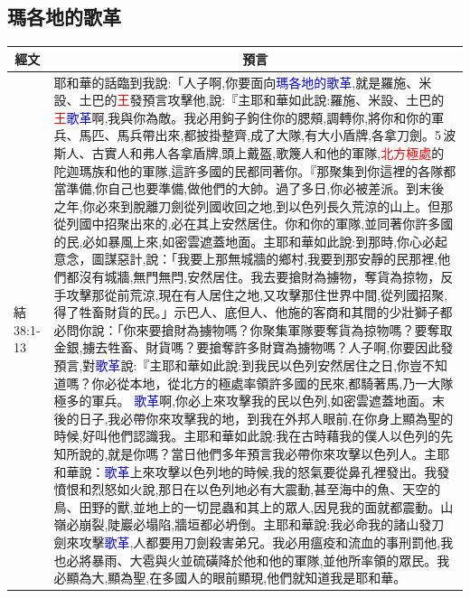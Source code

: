 \subsection{瑪各地的歌革}
\begin{table}[H]
\centering
\begin{tabular}{p{}|p{16.5cm}}\hline\hline
  \multicolumn{1}{c|}{經文}&\multicolumn{1}{c}{預言}\\\hline


結38:1-13&耶和華的話臨到我說:「人子啊,你要面向\textcolor{blue}{瑪各地的歌革},就是羅施、米設、土巴的\textcolor{red}{王}發預言攻擊他,說:『主耶和華如此說:羅施、米設、土巴的\textcolor{red}{王}\textcolor{blue}{歌革}啊,我與你為敵。我必用鉤子鉤住你的腮頰,調轉你,將你和你的軍兵、馬匹、馬兵帶出來,都披掛整齊,成了大隊,有大小盾牌,各拿刀劍。5 波斯人、古實人和弗人各拿盾牌,頭上戴盔,歌篾人和他的軍隊,\textcolor{red}{北方極處}的陀迦瑪族和他的軍隊,這許多國的民都同著你。『那聚集到你這裡的各隊都當準備,你自己也要準備,做他們的大帥。過了多日,你必被差派。到末後之年,你必來到脫離刀劍從列國收回之地,到以色列長久荒涼的山上。但那從列國中招聚出來的,必在其上安然居住。你和你的軍隊,並同著你許多國的民,必如暴風上來,如密雲遮蓋地面。主耶和華如此說:到那時,你心必起意念，圖謀惡計,說：「我要上那無城牆的鄉村,我要到那安靜的民那裡,他們都沒有城牆,無門無閂,安然居住。我去要搶財為擄物，奪貨為掠物，反手攻擊那從前荒涼,現在有人居住之地,又攻擊那住世界中間,從列國招聚,得了牲畜財貨的民。」示巴人、底但人、他施的客商和其間的少壯獅子都必問你說：「你來要搶財為擄物嗎？你聚集軍隊要奪貨為掠物嗎？要奪取金銀,擄去牲畜、財貨嗎？要搶奪許多財寶為擄物嗎？人子啊,你要因此發預言,對\textcolor{blue}{歌革}說:『主耶和華如此說:到我民以色列安然居住之日,你豈不知道嗎？你必從本地，從北方的極處率領許多國的民來,都騎著馬,乃一大隊極多的軍兵。 \textcolor{blue}{歌革}啊,你必上來攻擊我的民以色列,如密雲遮蓋地面。末後的日子,我必帶你來攻擊我的地，到我在外邦人眼前,在你身上顯為聖的時候,好叫他們認識我。主耶和華如此說:我在古時藉我的僕人以色列的先知所說的,就是你嗎？當日他們多年預言我必帶你來攻擊以色列人。主耶和華說：\textcolor{blue}{歌革}上來攻擊以色列地的時候,我的怒氣要從鼻孔裡發出。我發憤恨和烈怒如火說,那日在以色列地必有大震動,甚至海中的魚、天空的鳥、田野的獸,並地上的一切昆蟲和其上的眾人,因見我的面就都震動。山嶺必崩裂,陡巖必塌陷,牆垣都必坍倒。主耶和華說:我必命我的諸山發刀劍來攻擊\textcolor{blue}{歌革},人都要用刀劍殺害弟兄。我必用瘟疫和流血的事刑罰他,我也必將暴雨、大雹與火並硫磺降於他和他的軍隊,並他所率領的眾民。我必顯為大,顯為聖,在多國人的眼前顯現,他們就知道我是耶和華。\\\hline



\end{tabular}
\end{table}
